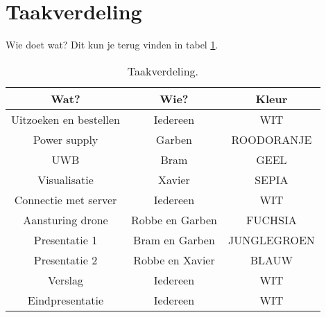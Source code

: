 \section{Taakverdeling} \label{sec:taakverdeling}
Wie doet wat? Dit kun je terug vinden in tabel \ref{tab:taakverdeling}.
\begin{table}[p]
\centering
\begin{tabular}{ |c|c|c| } \hline
Wat? & Wie? & Kleur \\ [.5ex] \hline\hline
Uitzoeken en bestellen & Iedereen & WIT \\ \hline
Power supply & Garben & ROODORANJE \\ \hline
UWB & Bram & GEEL \\ \hline
Visualisatie & Xavier & SEPIA \\ \hline
Connectie met server & Iedereen & WIT \\ \hline
Aansturing drone & Robbe en Garben & FUCHSIA \\ \hline
Presentatie 1 & Bram en Garben & JUNGLEGROEN \\ \hline
Presentatie 2 & Robbe en Xavier & BLAUW \\ \hline
Verslag & Iedereen & WIT \\ \hline
Eindpresentatie & Iedereen & WIT \\ \hline
\end{tabular}
\caption[Taakverdeling]{Taakverdeling.}
\label{tab:taakverdeling}
\end{table}

